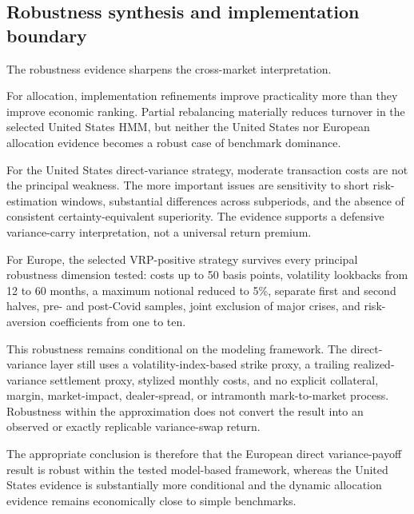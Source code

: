 \subsection{Robustness synthesis and implementation boundary}

The robustness evidence sharpens the cross-market interpretation.

For allocation, implementation refinements improve practicality more than they improve economic ranking. Partial rebalancing materially reduces turnover in the selected United States HMM, but neither the United States nor European allocation evidence becomes a robust case of benchmark dominance.

For the United States direct-variance strategy, moderate transaction costs are not the principal weakness. The more important issues are sensitivity to short risk-estimation windows, substantial differences across subperiods, and the absence of consistent certainty-equivalent superiority. The evidence supports a defensive variance-carry interpretation, not a universal return premium.

For Europe, the selected VRP-positive strategy survives every principal robustness dimension tested: costs up to 50 basis points, volatility lookbacks from 12 to 60 months, a maximum notional reduced to 5\%, separate first and second halves, pre- and post-Covid samples, joint exclusion of major crises, and risk-aversion coefficients from one to ten.

This robustness remains conditional on the modeling framework. The direct-variance layer still uses a volatility-index-based strike proxy, a trailing realized-variance settlement proxy, stylized monthly costs, and no explicit collateral, margin, market-impact, dealer-spread, or intramonth mark-to-market process. Robustness within the approximation does not convert the result into an observed or exactly replicable variance-swap return.

The appropriate conclusion is therefore that the European direct variance-payoff result is robust within the tested model-based framework, whereas the United States evidence is substantially more conditional and the dynamic allocation evidence remains economically close to simple benchmarks.
